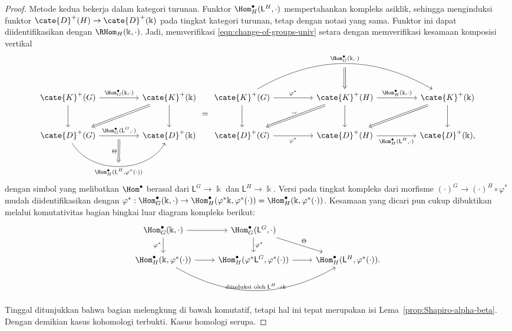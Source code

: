 \begin{proof}
	Metode kedua bekerja dalam kategori turunan. Funktor
	$\Hom^\bullet_H(\mathsf{L}^H,\cdot)$ mempertahankan kompleks asiklik,
	sehingga menginduksi funktor
	$\cate{D}^+(H)\to\cate{D}^+(\Bbbk)$ pada tingkat kategori turunan, tetap
	dengan notasi yang sama. Funktor ini dapat diidentifikasikan dengan
	$\RHom_H(\Bbbk,\cdot)$. Jadi, memverifikasi
	\eqref{eqn:change-of-groups-univ} setara dengan memverifikasi kesamaan
	komposisi vertikal
	\begin{equation*}
		\begin{tikzcd}[column sep=huge, row sep=large]
			\cate{K}^+(G) \arrow[r, "{\Hom^\bullet_G(\Bbbk, \cdot)}"] \arrow[d] & \cate{K}^+(\Bbbk) \arrow[d] \arrow[Rightarrow, ld] \\
			\cate{D}^+(G) \arrow[r, "{\Hom^\bullet_G(\mathsf{L}^G, \cdot)}", ""' {name=D}] \arrow[r, bend right=60, "" {name=U}, "{\Hom^\bullet_H(\mathsf{L}^H, \varphi^*(\cdot))}"'] & \cate{D}^+(\Bbbk) \arrow[Rightarrow, from=D, to=U, "\Theta"']
		\end{tikzcd} = \begin{tikzcd}[column sep=huge, row sep=large]
			\cate{K}^+(G) \arrow[d] \arrow[r, "{\varphi^*}"] \arrow[rr, bend left, "{\Hom^\bullet_G(\Bbbk, \cdot)}", "{}"' {name=U}] & \cate{K}^+(H) \arrow[d] \arrow[r, "{\Hom^\bullet_H(\Bbbk, \cdot)}"] \arrow[from=U, Rightarrow] \arrow[Rightarrow, ld, "\sim" sloped] & \cate{K}^+(\Bbbk) \arrow[d] \arrow[Rightarrow, ld] \\
			\cate{D}^+(G) \arrow[r, "{\varphi^*}"'] & \cate{D}^+(H) \arrow[r, "{\Hom^\bullet_H(\mathsf{L}^H, \cdot)}"'] & \cate{D}^+(\Bbbk) ,
		\end{tikzcd}
	\end{equation*}
dengan simbol  yang melibatkan
$\Hom^\bullet$ berasal dari $\mathsf{L}^G\to\Bbbk$ dan
$\mathsf{L}^H\to\Bbbk$. Versi pada tingkat kompleks dari morfisme
$(\cdot)^G\to(\cdot)^H\circ\varphi^*$ mudah diidentifikasikan dengan
$\varphi^*:\Hom^\bullet_G(\Bbbk,\cdot)\to
\Hom^\bullet_H(\varphi^*\Bbbk,\varphi^*(\cdot))
=\Hom^\bullet_H(\Bbbk,\varphi^*(\cdot))$. Kesamaan yang dicari pun cukup
dibuktikan melalui komutativitas bagian bingkai luar diagram kompleks berikut:
	\[\begin{tikzcd}
		\Hom^\bullet_G(\Bbbk, \cdot) \arrow[r] \arrow[d, "{\varphi^*}"'] & \Hom^\bullet_G(\mathsf{L}^G, \cdot) \arrow[d, "{\varphi^*}"] \arrow[rd, "\Theta"] & \\
		\Hom^\bullet_H(\Bbbk, \varphi^*(\cdot)) \arrow[r] \arrow[rr, bend right=30, "{\text{diinduksi oleh}\; \mathsf{L}^H \to \Bbbk}"] & \Hom^\bullet_H(\varphi^* \mathsf{L}^G, \varphi^*(\cdot)) \arrow[r] & \Hom^\bullet_H(\mathsf{L}^H, \varphi^*(\cdot)).
	\end{tikzcd}\]
	Tinggal ditunjukkan bahwa bagian melengkung di bawah komutatif, tetapi hal
	ini tepat merupakan isi Lema~\ref{prop:Shapiro-alpha-beta}. Dengan demikian
	kasus kohomologi terbukti. Kasus homologi serupa.


\end{proof}
